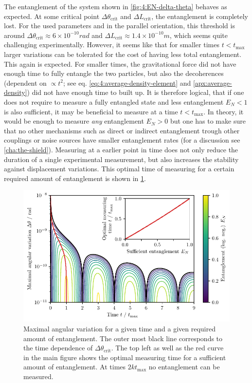 The entanglement of the system shown in \cref{fig:4:EN-delta-theta} behaves as expected. At some critical point $\Delta \theta_\mathrm{crit}$ and $\Delta L_\mathrm{crit}$, the entanglement is completely lost.
For the used parameters and in the parallel orientation, this threshold is around $\Delta \theta_\mathrm{crit} \approx 6 \times 10^{-10} \si{rad}$ and $\Delta L_\mathrm{crit} \approx 1.4 \times 10^{-10} \si{m}$, which seems quite challenging experimentally.
However, it seems like that for smaller times $t<t_\mathrm{max}$ larger variations can be tolerated for the cost of having less total entanglement.
This again is expected. For smaller times, the gravitational force did not have enough time to fully entangle the two particles, but also the decoherences (dependent on $\propto t^2$; see eq. \eqref{eq:4:average-density-element} and \cref{apx:average-density}) did not have enough time to built up. 
It is therefore logical, that if one does not require to measure a fully entangled state and less entanglement $E_N < 1$ is also sufficient, it may be beneficial to measure at a time $t < t_\mathrm{max}$. In theory, it would be enough to measure \textit{any} entanglement $E_N > 0$ but one has to make sure that no other mechanisms such as direct or indirect entanglement trough other couplings or noise sources have smaller entanglement rates (for a discussion see \cref{cha:the-shield}). 
Measuring at a earlier point in time does not only reduce the duration of a single experimental measurement, but also increases the stability against displacement variations. This optimal time of measuring for a certain required amount of entanglement is shown in \cref{fig:4:time-delta-theta}.
\begin{figure}[!htb]
  \centering
  \includegraphics[width=\textwidth]{./../figures/theta-variance/time-delta-theta-crit-EN.pdf}
  \caption{Maximal angular variation for a given time and a given required amount of entanglement. The outer most black line corresponds to the time dependence of $\Delta \theta_\mathrm{crit}$. The top left as well as the red curve in the main figure shows the optimal measuring time for a sufficient amount of entanglement.
  At times $2k t_\mathrm{max}$ no entanglement can be measured.}
  \label{fig:4:time-delta-theta}
\end{figure}
